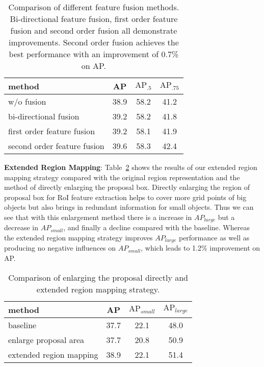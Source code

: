 \documentclass[10pt,twocolumn,letterpaper]{article}
\begin{document}
\begin{table}[t]
\begin{center}
\begin{tabular}{ l | c | c  c }
\hline
method & AP & $\text{AP}_{.5}$ & $\text{AP}_{.75}$ \\
\hline
w/o fusion  & 38.9 & 58.2 & 41.2 \\
bi-directional fusion~\cite{chu2016structured}  & 39.2 & 58.2 & 41.8  \\
first order feature fusion  & 39.2 & 58.1 & 41.9  \\
second order feature fusion  & 39.6 & 58.3 & 42.4 \\
\hline
\end{tabular}
\vspace{1mm}
\caption{Comparison of different feature fusion methods. Bi-directional feature fusion, first order feature fusion and second order fusion all demonstrate improvements. Second order fusion achieves the best performance with an improvement of 0.7\% on AP.}
\label{tab:fusion}
\end{center}
\end{table}

\textbf{Extended Region Mapping}: Table~\ref{tab:extend} shows the results of our extended region mapping strategy compared with the original region representation and the method of directly enlarging the proposal box. Directly enlarging the region of proposal box for RoI feature extraction helps to cover more grid points of big objects but also brings in redundant information for small objects. Thus we can see that with this enlargement method there is a increase in $AP_{large}$ but a decrease in $AP_{small}$, and finally a decline compared with the baseline. Whereas the extended region mapping strategy improves $AP_{large}$ performance as well as producing no negative influences on $AP_{small}$, which leads to 1.2\% improvement on AP. 
\begin{table}[t]
\begin{center}
\begin{tabular}{ l | c | c  c }
\hline
method & AP & $\text{AP}_{small}$ & $\text{AP}_{large}$ \\
\hline
baseline  & 37.7 & 22.1 & 48.0 \\
enlarge proposal area  & 37.7 & 20.8 & 50.9  \\
extended region mapping  & 38.9 & 22.1 & 51.4  \\
\hline
\end{tabular}
\vspace{1mm}
\caption{Comparison of enlarging the proposal directly and extended region mapping strategy.}
\label{tab:extend}
\vspace{-5mm}
\end{center}
\end{table}
\end{document}
